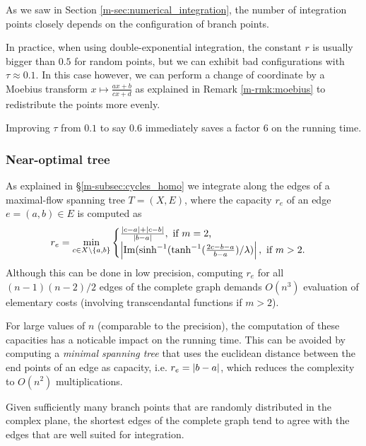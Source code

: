 \documentclass[main.tex]{subfiles}
\begin{document}
   As we saw in Section \ref{m-sec:numerical_integration}, the number of integration points
   closely depends on the configuration of branch points.

   In practice, when using double-exponential integration, the constant $r$ is usually bigger than $0.5$
   for random points, but we can exhibit bad configurations with $τ\approx 0.1$.
   In this case however, we can perform a change of coordinate by a Moebius transform
   $x\mapsto \frac{ax+b}{cx+d}$ as explained in Remark \ref{m-rmk:moebius} to redistribute the points more evenly.

   Improving $τ$ from $0.1$ to say $0.6$ immediately saves a factor $6$ on the running time.

   \subsubsection{Near-optimal tree}
    As explained in \S \ref{m-subsec:cycles_homo} we integrate along the edges of a maximal-flow spanning tree $T = (X,E)$, where the capacity $r_e$ of an edge $e = (a,b) \in E$ is computed as
    \begin{equation*}
     r_e =  \min_{c \in X \setminus \{ a,b\}} \begin{cases}
         \frac{\left|c-a\right|+\left|c-b\right|}{\left|b-a\right|}, \text{ if $m=2$,}\\
         \left| \operatorname{Im}(\sinh^{-1}(\tanh^{-1}(\frac{2c - b -a}{b-a})/\lambda) \right|, \text{ if $m>2$.}
            \end{cases}
    \end{equation*}
    Although this can be done in low precision, computing $r_e$ for all $(n-1)(n-2)/2$ edges of the complete graph
    demands $O(n^3)$ evaluation of elementary costs (involving transcendantal functions if $m>2$).

    For large values of $n$ (comparable to the precision), the computation of
    these capacities has a noticable impact on the running time. This can be
    avoided by computing a \emph{minimal spanning tree} that uses the euclidean
    distance between the end points of an edge as capacity, i.e.
    $r_e = \left|b-a\right|$, which reduces the complexity to $O(n^2)$
    multiplications.

    Given sufficiently many branch points that are randomly distributed in the
    complex plane, the shortest edges of the complete graph tend to agree with
    the edges that are well suited for integration.
\end{document}
